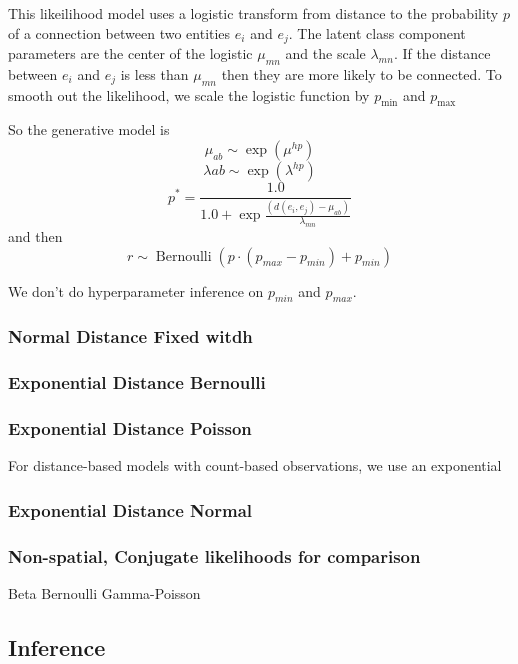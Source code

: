\documentclass{article}
\begin{document}
This likeilihood model uses a logistic transform from distance to the
probability $p$ of a connection between two entities $e_i$ and
$e_j$. The latent class component parameters are the center of the
logistic $\mu_{mn}$ and the scale $\lambda_{mn}$. If the distance
between $e_i$ and $e_j$ is less than $\mu_{mn}$ then they are more
likely to be connected. To smooth out the likelihood, we scale the logistic
function by $p_{\textrm{min}}$ and $p_{\textrm{max}}$

So the generative model is
\[\mu_{ab} \sim \exp(\mu^{hp}) \]
\[\lambda{ab} \sim \exp(\lambda^{hp}) \]
\[p^* = \frac{1.0}{1.0 + \exp{\frac{(d(e_i, e_j) - \mu_{ab})}{\lambda_{mn}}}}\]
and then 
\[ r \sim \operatorname{Bernoulli}(p\cdot (p_{max} - p_{min}) + p_{min}) \]

We don't do hyperparameter inference on $p_{min}$ and $p_{max}$. 

\subsubsection{Normal Distance Fixed witdh}

\subsubsection{Exponential Distance Bernoulli}


\subsubsection{Exponential Distance Poisson}
For distance-based models with count-based observations, we use an exponential 




\subsubsection{Exponential Distance Normal}


\subsubsection{Non-spatial, Conjugate likelihoods for comparison}
Beta Bernoulli
Gamma-Poisson

\subsection{Inference}
\end{document}
